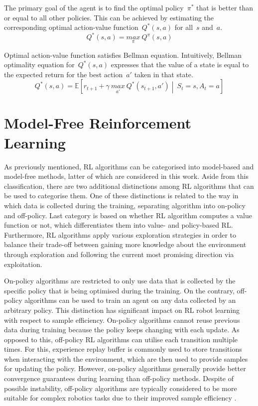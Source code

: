 The primary goal of the agent is to find the optimal policy~\(\pi^{*}\) that is better than or equal to all other policies. This can be achieved by estimating the corresponding optimal action-value function~\(Q^{*}(s, a)\) for all~\(s\) and~\(a\).
\begin{equation}
    Q^{*}(s, a) = \underset{\pi}{max}\ Q^{\pi}(s, a)
    \label{eq:optimal_action_value_function}
\end{equation}

Optimal action-value function satisfies Bellman equation. Intuitively, Bellman optimality equation for~\(Q^{*}(s, a)\) expresses that the value of a state is equal to the expected return for the best action~\(a'\) taken in that state.
\begin{equation}
    Q^{*}(s, a) = \mathbb{E} \left[ r_{t+1} + \gamma\ \underset{a'}{max}\ Q^{*}(s_{t+1}, a') \middle\vert\ S_{t}{=}s, A_{t}{=}a \right]
\end{equation}


\section{Model-Free Reinforcement Learning}

As previously mentioned, RL algorithms can be categorised into model-based and model-free methods, latter of which are considered in this work. Aside from this classification, there are two additional distinctions among RL algorithms that can be used to categorise them. One of these distinctions is related to the way in which data is collected during the training, separating algorithm into on-policy and off-policy. Last category is based on whether RL algorithm computes a value function or not, which differentiates them into value- and policy-based RL. Furthermore, RL algorithms apply various exploration strategies in order to balance their trade-off between gaining more knowledge about the environment through exploration and following the current most promising direction via exploitation.

On-policy algorithms are restricted to only use data that is collected by the specific policy that is being optimised during the training. On the contrary, off-policy algorithms can be used to train an agent on any data collected by an arbitrary policy. This distinction has significant impact on RL robot learning with respect to sample efficiency. On-policy algorithms cannot reuse previous data during training because the policy keeps changing with each update. As opposed to this, off-policy RL algorithms can utilise each transition multiple times. For this, experience replay buffer \cite{mnih_human-level_2015} is commonly used to store transitions when interacting with the environment, which are then used to provide samples for updating the policy. However, on-policy algorithms generally provide better convergence guarantees during learning than off-policy methods. Despite of possible instability, off-policy algorithms are typically considered to be more suitable for complex robotics tasks due to their improved sample efficiency \cite{quillen_deep_2018}.


